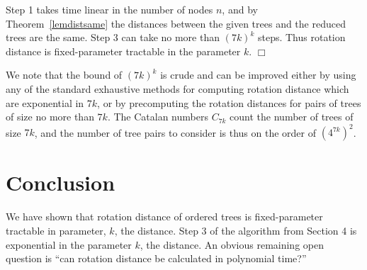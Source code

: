 \documentclass[12pt]{article}
\begin{document}
Step 1 takes time linear in the number of nodes $n$, and by Theorem~\ref{lemdistsame} the distances between the given trees and the
reduced trees are the same.  Step 3 can take no more than $(7k)^k$ steps.  Thus rotation distance is 
fixed-parameter tractable in the parameter $k$.
\hfill $\Box$

\bigskip

We note that the bound of $(7k)^k$ is crude and can be improved either by using any of the standard exhaustive methods for computing rotation distance which are exponential in $7k$, or by precomputing the rotation distances for pairs of trees of size no more than $7k$.  The Catalan numbers $C_{7k}$ count the number of trees of size $7k$, and  the number of tree pairs to consider is thus on the order of $(4^{7k})^2$.

\section{Conclusion } 

We have shown that rotation distance of ordered trees is
fixed-parameter tractable in parameter, $k$, the distance.
Step 3 of the algorithm from Section 4 is exponential in the parameter $k$, the
distance.
An obvious remaining open question is ``can rotation distance be calculated in 
polynomial time?''
\end{document}
